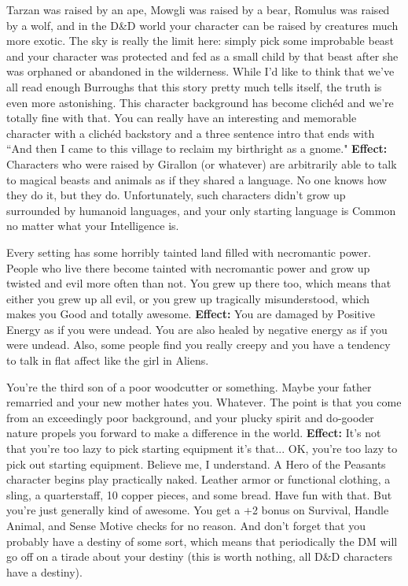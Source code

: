 \medskip{}
{Tarzan was raised by an ape, Mowgli was raised by a bear, Romulus was raised by a wolf, and in the D\&D world your character can be raised by creatures much more exotic. The sky is really the limit here: simply pick some improbable beast and your character was protected and fed as a small child by that beast after she was orphaned or abandoned in the wilderness. While I'd like to think that we've all read enough Burroughs that this story pretty much tells itself, the truth is even more astonishing. This character background has become clich\'ed and we're totally fine with that. You can really have an interesting and memorable character with a clich\'ed backstory and a three sentence intro that ends with ``And then I came to this village to reclaim my birthright as a gnome."}
\textbf{Effect:}{ Characters who were raised by Girallon (or whatever) are arbitrarily able to talk to magical beasts and animals as if they shared a language. No one knows how they do it, but they do. Unfortunately, such characters didn't grow up surrounded by humanoid languages, and your only starting language is Common no matter what your Intelligence is.}

\medskip{}
{Every setting has some horribly tainted land filled with necromantic power. People who live there become tainted with necromantic power and grow up twisted and evil more often than not. You grew up there too, which means that either you grew up all evil, or you grew up tragically misunderstood, which makes you Good and totally awesome.}
\textbf{Effect:}{ You are damaged by Positive Energy as if you were undead. You are also healed by negative energy as if you were undead. Also, some people find you really creepy and you have a tendency to talk in flat affect like the girl in Aliens.}

\medskip{}
{You're the third son of a poor woodcutter or something. Maybe your father remarried and your new mother hates you. Whatever. The point is that you come from an exceedingly poor background, and your plucky spirit and do-gooder nature propels you forward to make a difference in the world.}
\textbf{Effect:}{ It's not that you're too lazy to pick starting equipment it's that... OK, you're too lazy to pick out starting equipment. Believe me, I understand. A Hero of the Peasants character begins play practically naked. Leather armor or functional clothing, a sling, a quarterstaff, 10 copper pieces, and some bread. Have fun with that. But you're just generally kind of awesome. You get a +2 bonus on Survival, Handle Animal, and Sense Motive checks for no reason. And don't forget that you probably have a destiny of some sort, which means that periodically the DM will go off on a tirade about your destiny (this is worth nothing, all D\&D characters have a destiny).}

